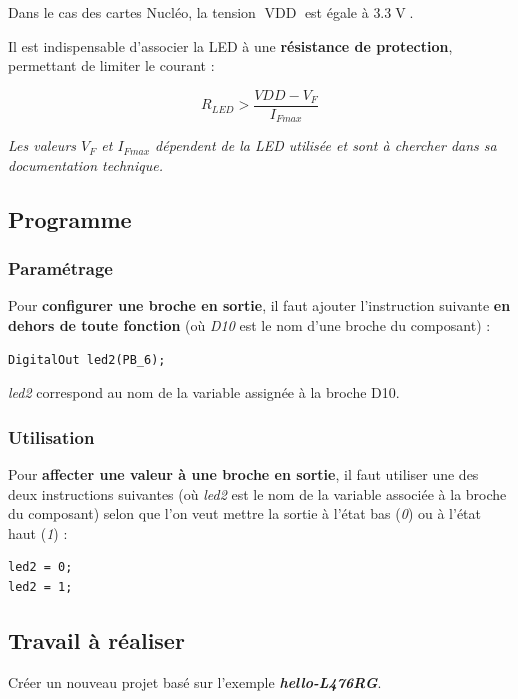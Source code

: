 \documentclass[a4paper,11pt,titlepage]{article} %
\begin{document}
Dans le cas des cartes Nucléo, la tension $\operatorname{VDD}$ est égale à $3.3\operatorname{V}$.

Il est indispensable d'associer la LED à une \textbf{résistance de protection}, permettant de limiter le courant : 

$$R_{LED} > \frac{VDD - V_{F}}{I_{Fmax}}$$

\textit{Les valeurs $V_F$ et $I_{Fmax}$ dépendent de la LED utilisée et sont à chercher dans sa documentation technique.}


\subsection{Programme}

\subsubsection{Paramétrage}

Pour \textbf{configurer une broche en sortie}, il faut ajouter l'instruction suivante \textbf{en dehors de toute fonction} (où \textsl{D10} est le nom d'une broche du composant) :

\begin{lstlisting}
DigitalOut led2(PB_6);
\end{lstlisting}

\textsl{led2} correspond au nom de la variable assignée à la broche \textsc{D10}.

\subsubsection{Utilisation}

Pour \textbf{affecter une valeur à une broche en sortie}, il faut utiliser une des deux instructions suivantes (où \textsl{led2} est le nom de la variable associée à la broche du composant) selon que l'on veut mettre la sortie à l'état bas (\textit{0}) ou à l'état haut (\textit{1}) :

\begin{lstlisting}
led2 = 0;
led2 = 1;
\end{lstlisting}


\subsection{Travail à réaliser}

\Manip Créer un nouveau projet basé sur l'exemple \textbf{\textsl{hello-L476RG}}.
\end{document}
